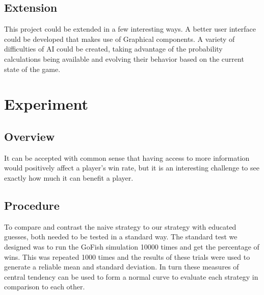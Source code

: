 \documentclass[preprint,12pt]{elsarticle}
\begin{document}
\subsection{Extension} 
This project could be extended in a few interesting ways. A better user interface could be developed that makes use of Graphical components. A variety of difficulties of AI could be created, taking advantage of the probability calculations being available and evolving their behavior based on the current state of the game.

\section{Experiment}
\label{S:2}
\subsection{Overview}
It can be accepted with common sense that having access to more information would positively affect a player's win rate, but it is an interesting challenge to see exactly how much it can benefit a player.

\subsection{Procedure}
To compare and contrast the naive strategy to our strategy with educated guesses, both needed to be tested in a standard way. The standard test we designed was to run the GoFish simulation 10000 times and get the percentage of wins. This was repeated 1000 times and the results of these trials were used to generate a reliable mean and standard deviation. In turn these measures of central tendency can be used to form a normal curve to evaluate each strategy in comparison to each other.
\end{document}
